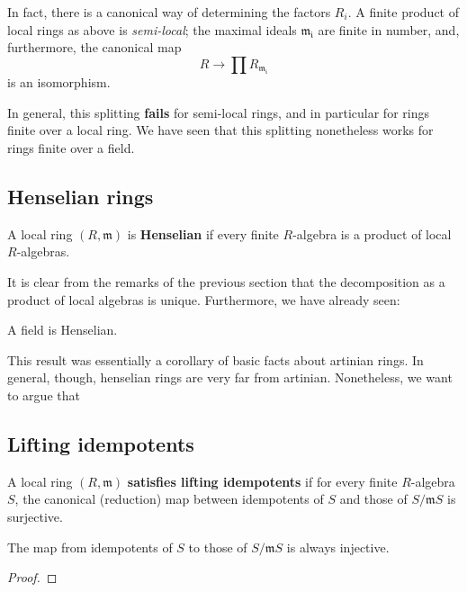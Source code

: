 In fact, there is a canonical way of determining the factors $R_i$. 
A finite product of local rings as above is \textit{semi-local}; 
the maximal ideals $\mathfrak{m_i}$ are finite in number, and, furthermore, the
canonical map
\[ R \to \prod R_{\mathfrak{m_i}} \]
is an isomorphism.


In general, this splitting \textbf{fails} for semi-local rings, and in
particular for rings finite over a local ring.
We have seen that this splitting nonetheless works for rings finite
over a field.


\subsection{Henselian rings}

\begin{definition}
A local ring $(R, \mathfrak{m})$ is \textbf{Henselian} if every finite
$R$-algebra is a product of local $R$-algebras.
\end{definition}


It is clear from the remarks of the previous section that the 
decomposition as a product of local algebras is unique.
Furthermore, we have already seen:

\begin{proposition} 
A field is Henselian. 
\end{proposition}

This result was essentially a corollary of basic facts about artinian
rings. In general, though, henselian rings are very far from artinian.
Nonetheless, we want to argue that 

\subsection{Lifting idempotents}

\begin{definition}
A local ring $(R, \mathfrak{m})$ \textbf{satisfies lifting
  idempotents} if for every finite $R$-algebra $S$, the canonical
(reduction) map
between idempotents of $S$ and those of $S/\mathfrak{m}S$ is surjective.
\end{definition}

\begin{proposition} 
The map from idempotents of $S$ to those of $S/\mathfrak{m} S$ is
always injective.
\end{proposition}


\begin{proof} 
 
\end{proof}

